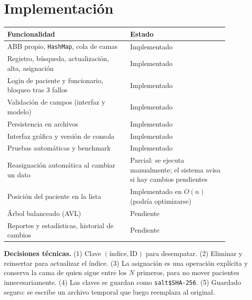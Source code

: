 \documentclass[11pt,a4paper]{article}
\begin{document}
\section{Implementación}
\begin{longtable}{@{}p{0.5\linewidth}p{0.4\linewidth}@{}}
\toprule \textbf{Funcionalidad} & \textbf{Estado}\\ \midrule \endhead
ABB propio, \texttt{HashMap}, cola de camas & Implementado\\
Registro, búsqueda, actualización, alta, asignación & Implementado\\
Login de paciente y funcionario, bloqueo tras 3 fallos & Implementado\\
Validación de campos (interfaz y modelo) & Implementado\\
Persistencia en archivos & Implementado\\
Interfaz gráfica y versión de consola & Implementado\\
Pruebas automáticas y benchmark & Implementado\\
Reasignación automática al cambiar un dato & Parcial: se ejecuta manualmente; el sistema avisa si hay cambios pendientes\\
Posición del paciente en la lista & Implementado en $O(n)$ (podría optimizarse)\\
Árbol balanceado (AVL) & Pendiente\\
Reportes y estadísticas, historial de cambios & Pendiente\\
\bottomrule
\end{longtable}
\textbf{Decisiones técnicas.} (1) Clave $(\text{índice},\text{ID})$ para desempatar. (2) Eliminar y reinsertar para actualizar el índice. (3) La asignación es una operación explícita y conserva la cama de quien sigue entre los $N$ primeros, para no mover pacientes innecesariamente. (4) Las claves se guardan como \texttt{salt\$SHA-256}. (5) Guardado seguro: se escribe un archivo temporal que luego reemplaza al original.
\end{document}
